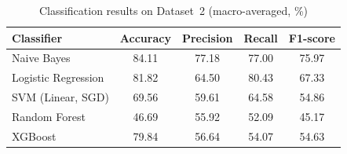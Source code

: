\begin{table}[H]
\centering
\caption{Classification results on Dataset~2 (macro-averaged, \%)}
\label{tab:results_dataset2}
\begin{tabular}{@{}lcccc@{}}
\toprule
\textbf{Classifier} & \textbf{Accuracy} & \textbf{Precision} & \textbf{Recall} & \textbf{F1-score} \\
\midrule
Naive Bayes                  & 84.11 & 77.18 & 77.00 & 75.97 \\
Logistic Regression          & 81.82 & 64.50 & 80.43 & 67.33 \\
SVM (Linear, SGD)            & 69.56 & 59.61 & 64.58 & 54.86 \\
Random Forest                & 46.69 & 55.92 & 52.09 & 45.17 \\
XGBoost                      & 79.84 & 56.64 & 54.07 & 54.63 \\
\bottomrule
\end{tabular}
\end{table}
